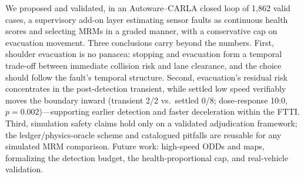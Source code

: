 \documentclass[letterpaper, 10pt, conference]{ieeeconf}
\begin{document}
We proposed and validated, in an Autoware--CARLA closed loop of 1{,}862
valid cases, a supervisory add-on layer estimating sensor faults as
continuous health scores and selecting MRMs in a graded manner, with a
conservative cap on evacuation movement. Three conclusions carry beyond
the numbers. First, shoulder evacuation is no panacea: stopping and evacuation form
a temporal trade-off between immediate collision risk and lane clearance,
and the choice should follow the fault's temporal structure. Second,
evacuation's residual risk concentrates in the post-detection transient,
while settled low speed verifiably moves the boundary inward (transient
2/2 vs.\ settled 0/8; dose-response 10:0, $p=0.002$)---supporting earlier
detection and faster deceleration within the FTTI. Third, simulation safety claims hold only
on a validated adjudication framework; the ledger/physics-oracle scheme
and catalogued pitfalls are reusable for any simulated MRM comparison. Future work: high-speed ODDs and maps, formalizing the detection
budget, the health-proportional cap, and real-vehicle validation.
\end{document}
